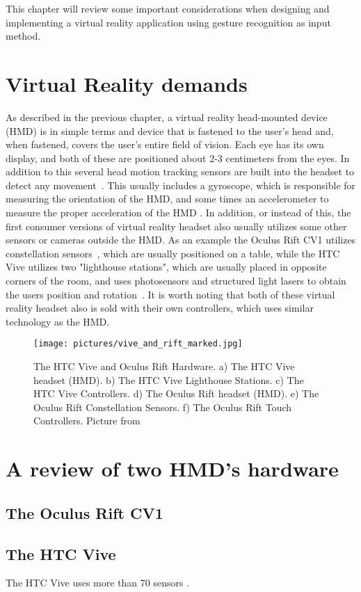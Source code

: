 This chapter will review some important considerations when designing and implementing a virtual reality application using gesture recognition as input method.

\section{Virtual Reality demands}
As described in the previous chapter, a virtual reality head-mounted device (HMD) is in simple terms and device that is fastened to the user's head and, when fastened, covers the
user's entire field of vision. Each eye has its own display, and both of these are positioned about 2-3 centimeters from the eyes. In addition to this several head motion
tracking sensors are built into the headset to detect any movement~\citep{POLYGON2016}. This usually includes a gyroscope, which is responsible for measuring the orientation of the
HMD, and some times an accelerometer to measure the proper acceleration of the HMD \citep{THEVERGE2016}. In addition, or instead of this, the first consumer versions of 
virtual reality headset also usually utilizes some other sensors or cameras outside the HMD. As an example the Oculus Rift CV1 utilizes constellation sensors~\cite{VRFOCUS2015}, 
which are usually positioned on a table, while the HTC Vive utilizes two "lighthouse stations", which are usually placed in opposite corners of the room, and uses photosensors and 
structured light lasers to obtain the users position and rotation~\cite{GIZMODO2015}. 
It is worth noting that both of these virtual reality headset also is sold with their own controllers, which uses similar technology as the HMD.  

\begin{figure}%
	\texttt{[image: pictures/vive\_and\_rift\_marked.jpg]}
	\caption[The HTC Vive and Oculus Rift Hardware]{The HTC Vive and Oculus Rift Hardware. 
    a) The HTC Vive headset (HMD). b) The HTC Vive Lighthouse Stations. c) The HTC Vive Controllers. d) The Oculus Rift headset (HMD). e) The Oculus Rift Constellation Sensors. 
    f) The Oculus Rift Touch Controllers. Picture from \citet{ROADTOVR2016}}
	\label{fig:vive_and_rift_marked}
\end{figure} 


\section{A review of two HMD's hardware}

\subsection{The Oculus Rift CV1}

\subsection{The HTC Vive}
The HTC Vive uses more than 70 sensors \citep{BBC2015}.